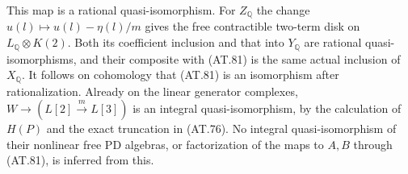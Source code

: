 This map is a rational quasi-isomorphism.
For $Z_{\mathbb Q}$ the change
$u(l)\mapsto u(l)-\eta(l)/m$ gives the free
contractible two-term disk on $L_{\mathbb Q}\otimes K(2)$.
Both its coefficient inclusion and that into
$Y_{\mathbb Q}$ are rational quasi-isomorphisms,
and their composite with (AT.81) is the same
actual inclusion of $X_{\mathbb Q}$.
It follows on cohomology that (AT.81) is an
isomorphism after rationalization.
Already on the linear generator complexes,
$W\to(L[2]\xrightarrow{m}L[3])$ is an integral
quasi-isomorphism, by the calculation of $H(P)$
and the exact truncation in (AT.76).
No integral quasi-isomorphism of their nonlinear
free PD algebras, or factorization of the maps
to $A,B$ through (AT.81), is inferred from this.


